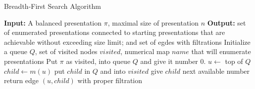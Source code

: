 
\begin{algorithm}
	\caption{Breadth-First Search Algorithm}\label{alg:bfs}
	\begin{algorithmic}[1] %
		\State \textbf{Input:} A balanced presentation $\pi$, maximal size of presentation $n$
		\State \textbf{Output:} set of enumerated presentations connected to starting presentations that are achievable without exceeding size limit; and set of egdes with filtrations
		\State Initialize a queue $Q$, set of visited nodes $visited$, numerical map $name$ that will enumerate presentations
		\State Put $\pi$ as visited, into queue $Q$ and give it number $0$.
		\State $u \gets $ top of $Q$
  \State $child \gets m(u)$
		\State put $child$ in $Q$ and into $visited$
  \State give $child$ next available number
		\EndIf
		\State return edge $(u, child)$ with proper filtration\EndIf
 
		\EndIf
		\EndFor
		\EndWhile
		
	\end{algorithmic}
\end{algorithm}

